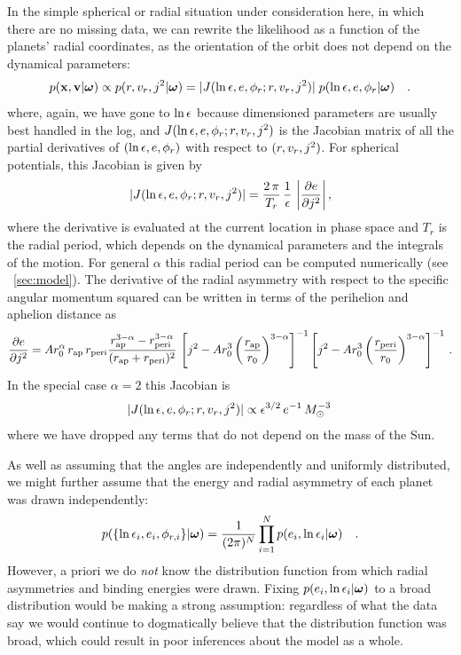 In the simple spherical or radial situation under consideration here,
in which there are no missing data, we can rewrite the likelihood as a
function of the planets' radial coordinates, as the orientation of the
orbit does not depend on the dynamical parameters:
\begin{equation}
p(\boldsymbol{\mathbf{x}},\boldsymbol{\mathbf{v}}|\boldsymbol{{\omega}}) \propto p(r,v_r,j^2|\boldsymbol{{\omega}}) =
|J(\ln{\epsilon},e,\phi_r;r,v_r,j^2)| \;p(\ln{\epsilon}, e,
\phi_r|\boldsymbol{{\omega}}) \quad .
\end{equation}
where, again, we have gone to $\ln{\epsilon}$ because dimensioned
parameters are usually best handled in the log, and
$J(\ln{\epsilon},e,\phi_r;r,v_r,j^2)$ is the Jacobian matrix of all
the partial derivatives of $(\ln{\epsilon},e,\phi_r)$ with respect to
$(r,v_r,j^2)$. For spherical potentials, this Jacobian is given by
\begin{equation}\label{eq:jacgeneral}
|J(\ln{\epsilon},e,\phi_r;r,v_r,j^2)| = \frac{2\,\pi}{T_r}\,\frac{1}{\epsilon}\,\left|\frac{\partial e}{\partial j^2}\right|,
\end{equation}
where the derivative is evaluated at the current location in phase
space and $T_r$ is the radial period, which depends on the dynamical
parameters and the integrals of the motion. For general $\alpha$ this
radial period can be computed numerically (see
\sectionname~\ref{sec:model}). The derivative of the radial asymmetry
with respect to the specific angular momentum squared can be written
in terms of the perihelion and aphelion distance as
\begin{equation}\label{eq:dedj2}
\frac{\partial e}{\partial j^2} = A r_0^{\alpha}\,r_{\mathrm{ap}}\, r_{\mathrm{peri}}
\frac{r_{\mathrm{ap}}^{3-\alpha} - r_{\mathrm{peri}}^{3-\alpha}}{(r_{\mathrm{ap}}+r_{\mathrm{peri}})^2}\,
\left[j^2-A r_0^3\left(\frac{r_{\mathrm{ap}}}{r_0}\right)^{3-\alpha}\right]^{-1}
\left[j^2-A r_0^3\left(\frac{r_{\mathrm{peri}}}{r_0}\right)^{3-\alpha}\right]^{-1}\,.
\end{equation}
In the special case $\alpha = 2$ this Jacobian is
\begin{equation}\label{eq:jacobian}
|J(\ln{\epsilon},e,\phi_r;r,v_r,j^2)| \propto \epsilon^{3/2}\,e^{-1}\,M_{\odot}^{-3}\,
\end{equation}
where we have dropped any terms that do not depend on the mass of the
Sun.

As well as assuming that the angles are independently and uniformly
distributed, we might further assume that the energy and radial
asymmetry of each planet was drawn independently:
\begin{equation}
    p(\{\ln{\epsilon}_i, e_i, \phi_{r,i}\}|\boldsymbol{{\omega}}) =
    \frac{1}{(2\pi)^N}
    \prod_{i=1}^N p(e_i,\ln{\epsilon}_i|\boldsymbol{{\omega}})\quad.
\end{equation}
However, a priori we do \emph{not} know the distribution function from
which radial asymmetries and binding energies were drawn. Fixing
$p(e_i,\ln{\epsilon}_i|\boldsymbol{{\omega}})$ to a broad distribution would be making
a strong assumption: regardless of what the data say we would continue
to dogmatically believe that the distribution function was broad,
which could result in poor inferences about the model as a whole.

